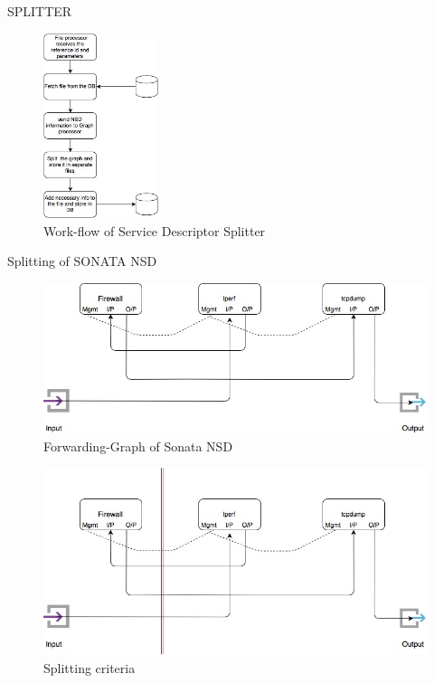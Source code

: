 \begin{frame}
\Huge{\centerline{SPLITTER}}
\end{frame}




\begin{frame}	
\begin{figure} [!]
	\centering
	\includegraphics[width=0.3\textwidth]{images/img-1-split}
	\caption{Work-flow of Service Descriptor Splitter}
\end{figure}
\end{frame}

\begin{frame}
\Huge{\centerline{Splitting of SONATA NSD}}
\end{frame}



\begin{frame}
\begin{figure}
	\centering 
	\includegraphics[width=0.5\linewidth]{images/img-2-split}
	\caption{Forwarding-Graph of Sonata NSD}
\end{figure}

\begin{figure}
	\centering 
	\includegraphics[width=0.5\linewidth]{images/img-3-split}
	\caption{Splitting criteria}
\end{figure}
\end{frame}



